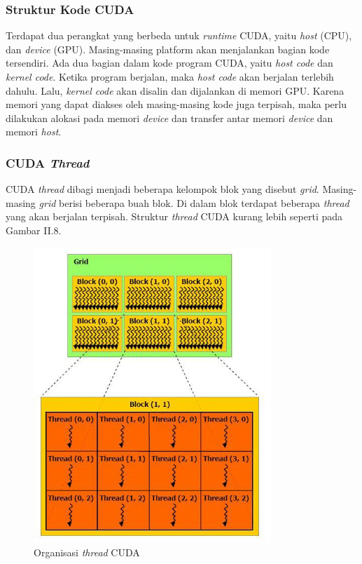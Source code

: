     \subsubsection{Struktur Kode CUDA}
    
      Terdapat dua perangkat yang berbeda untuk \emph{runtime} CUDA, yaitu \emph{host} (CPU), dan \emph{device} (GPU). Masing-masing platform akan menjalankan bagian kode tersendiri. Ada dua bagian dalam kode program CUDA, yaitu \emph{host code} dan \emph{kernel code}. Ketika program berjalan, maka \emph{host code} akan berjalan terlebih dahulu. Lalu, \emph{kernel code} akan disalin dan dijalankan di memori GPU. Karena memori yang dapat diakses oleh masing-masing kode juga terpisah, maka perlu dilakukan alokasi pada memori \emph{device} dan transfer antar memori \emph{device} dan memori \emph{host}.
    
    \subsubsection{CUDA \emph{Thread}}
    
      CUDA \emph{thread} dibagi menjadi beberapa kelompok blok yang disebut \emph{grid}. Masing-masing \emph{grid} berisi beberapa buah blok. Di dalam blok terdapat beberapa \emph{thread} yang akan berjalan terpisah. Struktur \emph{thread} CUDA kurang lebih seperti pada Gambar II.8.
      
      \begin{figure}[htb]
        \centering
        \includegraphics[width=0.8\textwidth]{resources/cudathread.jpg}
        \caption[Organisasi \emph{thread} CUDA]{Organisasi \emph{thread} CUDA \citep{cuda}}
      \end{figure}
      

